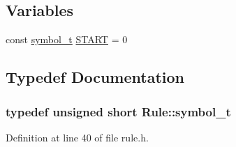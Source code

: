 \subsection*{Variables}
\begin{DoxyCompactItemize}
\item 
const \hyperlink{namespace_rule_a99f842acb142ee96951f03ee29eccc9e}{symbol\+\_\+t} \hyperlink{namespace_rule_a99b04a06cea10219deffee01662d82e7}{S\+T\+A\+R\+T} = 0
\end{DoxyCompactItemize}


\subsection{Typedef Documentation}
\hypertarget{namespace_rule_a99f842acb142ee96951f03ee29eccc9e}{
\subsubsection[{symbol\+\_\+t}]{\setlength{\rightskip}{0pt plus 5cm}typedef unsigned short {\bf Rule\+::symbol\+\_\+t}}}\label{namespace_rule_a99f842acb142ee96951f03ee29eccc9e}


Definition at line 40 of file rule.\+h.



